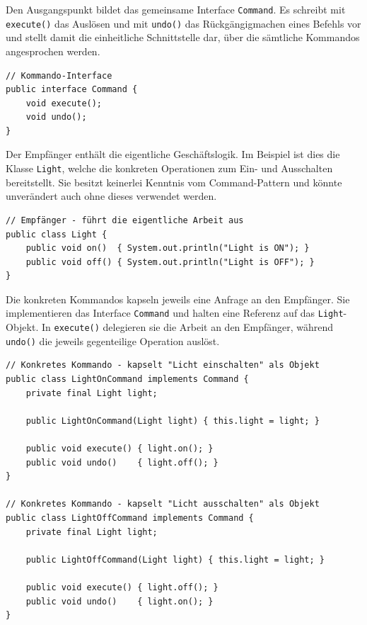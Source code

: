 \documentclass[12pt,a4paper]{article}
\begin{document}
    Den Ausgangspunkt bildet das gemeinsame Interface \texttt{Command}. Es schreibt mit \texttt{execute()} das
    Auslösen und mit \texttt{undo()} das Rückgängigmachen eines Befehls vor und stellt damit die einheitliche
    Schnittstelle dar, über die sämtliche Kommandos angesprochen werden.

    \begin{lstlisting}[caption={Das Kommando-Interface \texttt{Command}}, label={lst:command}]
// Kommando-Interface
public interface Command {
    void execute();
    void undo();
}
    \end{lstlisting}

    Der Empfänger enthält die eigentliche Geschäftslogik. Im Beispiel ist dies die Klasse \texttt{Light},
    welche die konkreten Operationen zum Ein- und Ausschalten bereitstellt. Sie besitzt keinerlei Kenntnis
    vom Command-Pattern und könnte unverändert auch ohne dieses verwendet werden.

    \begin{lstlisting}[caption={Der Empfänger \texttt{Light}}, label={lst:light}]
// Empfänger - führt die eigentliche Arbeit aus
public class Light {
    public void on()  { System.out.println("Light is ON"); }
    public void off() { System.out.println("Light is OFF"); }
}
    \end{lstlisting}

    Die konkreten Kommandos kapseln jeweils eine Anfrage an den Empfänger. Sie implementieren das Interface
    \texttt{Command} und halten eine Referenz auf das \texttt{Light}-Objekt. In \texttt{execute()} delegieren sie
    die Arbeit an den Empfänger, während \texttt{undo()} die jeweils gegenteilige Operation auslöst.

    \begin{lstlisting}[caption={Die konkreten Kommandos \texttt{LightOnCommand} und \texttt{LightOffCommand}}, label={lst:concrete}]
// Konkretes Kommando - kapselt "Licht einschalten" als Objekt
public class LightOnCommand implements Command {
    private final Light light;

    public LightOnCommand(Light light) { this.light = light; }

    public void execute() { light.on(); }
    public void undo()    { light.off(); }
}

// Konkretes Kommando - kapselt "Licht ausschalten" als Objekt
public class LightOffCommand implements Command {
    private final Light light;

    public LightOffCommand(Light light) { this.light = light; }

    public void execute() { light.off(); }
    public void undo()    { light.on(); }
}
    \end{lstlisting}
\end{document}
